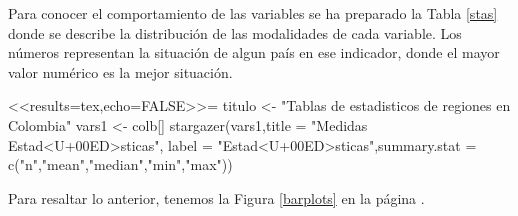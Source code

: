 \documentclass{article}
\begin{document}
Para conocer el comportamiento de las variables se ha preparado  la Tabla \ref{stas} donde se describe la distribuci\'on de las modalidades de cada variable. Los n\'umeros representan la situaci\'on de algun pa\'is en ese indicador, donde el mayor valor num\'erico es la mejor situaci\'on.

	<<results=tex,echo=FALSE>>=
titulo <- "Tablas de estadisticos de regiones en Colombia"
vars1 <- colb[]
stargazer(vars1,title = "Medidas Estad<U+00ED>sticas", label = "Estad<U+00ED>sticas",summary.stat = c("n","mean","median","min","max"))


\clearpage

Para resaltar lo anterior, tenemos la Figura \ref{barplots} en la p\'agina \pageref{barplots}. 
\end{document}

